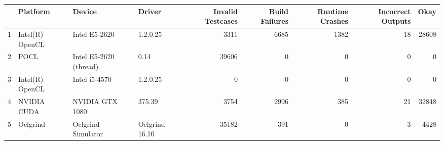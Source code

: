 \begin{tabular}{llllrrrrr}
\toprule
{} &         Platform &                  Device &          Driver &  Invalid Testcases &  Build Failures &  Runtime Crashes &  Incorrect Outputs &   Okay \\
\midrule
1 &  Intel(R) OpenCL &           Intel E5-2620 &        1.2.0.25 &               3311 &            6685 &             1382 &                 18 &  28608 \\
2 &             POCL &  Intel E5-2620 (thread) &            0.14 &              39606 &               0 &                0 &                  0 &      0 \\
3 &  Intel(R) OpenCL &           Intel i5-4570 &        1.2.0.25 &                  0 &               0 &                0 &                  0 &      0 \\
4 &      NVIDIA CUDA &         NVIDIA GTX 1080 &          375.39 &               3754 &            2996 &              385 &                 21 &  32848 \\
5 &         Oclgrind &      Oclgrind Simulator &  Oclgrind 16.10 &              35182 &             391 &                0 &                  3 &   4428 \\
\bottomrule
\end{tabular}
